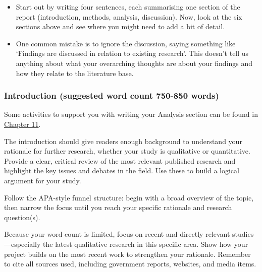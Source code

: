 \documentclass[
  english,
  letterpaper,
  DIV=11,
  numbers=noendperiod]{scrreprt}
\providecommand{\tightlist}{%
  \setlength{\itemsep}{0pt}\setlength{\parskip}{0pt}}
\begin{document}
\begin{tcolorbox}[enhanced jigsaw, breakable, bottomtitle=1mm, leftrule=.75mm, opacityback=0, colbacktitle=quarto-callout-warning-color!10!white, opacitybacktitle=0.6, toprule=.15mm, colback=white, left=2mm, coltitle=black, bottomrule=.15mm, titlerule=0mm, title={Tips}, toptitle=1mm, colframe=quarto-callout-warning-color-frame, arc=.35mm, rightrule=.15mm]

\begin{itemize}
\tightlist
\item
  Start out by writing four sentences, each summarising one section of
  the report (introduction, methods, analysis, discussion). Now, look at
  the six sections above and see where you might need to add a bit of
  detail.
\item
  One common mistake is to ignore the discussion, saying something like
  `Findings are discussed in relation to existing research'. This
  doesn't tell us anything about what your overarching thoughts are
  about your findings and how they relate to the literature base.
\end{itemize}

\end{tcolorbox}

\subsubsection{Introduction (suggested word count 750-850
words)}\label{introduction-suggested-word-count-750-850-words}

Some activities to support you with writing your Analysis section can be
found in \hyperref[eval_intro]{Chapter 11}.

The introduction should give readers enough background to understand
your rationale for further research, whether your study is qualitative
or quantitative. Provide a clear, critical review of the most relevant
published research and highlight the key issues and debates in the
field. Use these to build a logical argument for your study.

Follow the APA-style funnel structure: begin with a broad overview of
the topic, then narrow the focus until you reach your specific rationale
and research question(s).

Because your word count is limited, focus on recent and directly
relevant studies---especially the latest qualitative research in this
specific area. Show how your project builds on the most recent work to
strengthen your rationale. Remember to cite all sources used, including
government reports, websites, and media items.
\end{document}
